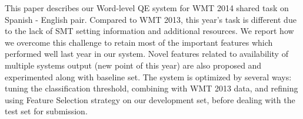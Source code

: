 This paper describes our Word-level QE system for WMT 2014 shared task on Spanish - English pair. Compared to WMT 2013, this year's task is different due to the lack of SMT setting information and additional resources. We report how we overcome this challenge to retain most of the important features which performed well last year in our system. Novel features related to availability of multiple systems output (new point of this year) are also proposed and experimented along with baseline set. The system is optimized by several ways: tuning the classification threshold, combining with WMT 2013 data, and refining using Feature Selection strategy on our development set, before dealing with the test set for submission.
